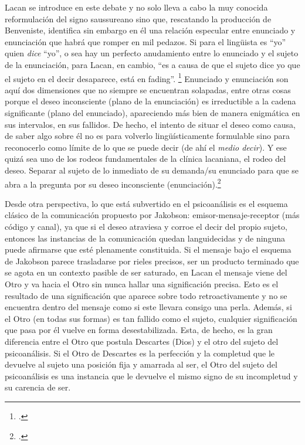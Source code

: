 Lacan se introduce en este debate y no solo lleva a cabo la muy conocida reformulación del signo saussureano sino que, rescatando la producción de Benveniste, identifica sin embargo en él una relación especular entre enunciado y enunciación que habrá que romper en mil pedazos. Si para el lingüista es \enquote{yo} quien \emph{dice} \enquote{yo}, o sea hay un perfecto anudamiento entre lo enunciado y el sujeto de la enunciación, para Lacan, en cambio, \enquote{es a causa de que el sujeto dice yo  que el sujeto en el decir desaparece, está en fading}. \footcite[][96]{@7129-GIUSSANI1991} Enunciado y enunciación son aquí dos dimensiones que no siempre se encuentran solapadas, entre otras cosas porque el deseo inconsciente (plano de la enunciación) es irreductible a la cadena significante (plano del enunciado), apareciendo más bien de manera enigmática en sus intervalos, en sus fallidos. De hecho, el intento de situar el deseo como causa, de saber algo sobre él no es para volverlo lingüísticamente formulable sino para reconocerlo como límite de lo que se puede decir (de ahí el \emph{medio decir}). Y ese quizá sea uno de los rodeos fundamentales de la clínica lacaniana, el rodeo del deseo. Separar al sujeto de lo inmediato de su demanda/su enunciado  para que se abra a la pregunta por su deseo inconsciente (enunciación).\footcite[][169]{@7016-MARQUESRODILLA2001}

Desde otra perspectiva, lo que está subvertido en el psicoanálisis es el esquema clásico de la comunicación propuesto por Jakobson: emisor-mensaje-receptor (más código y canal), ya que si el deseo atraviesa y corroe el decir del propio sujeto, entonces las instancias de la comunicación quedan languidecidas y de ninguna puede afirmarse que esté plenamente constituida. Si el mensaje bajo el esquema de Jakobson parece trasladarse por rieles precisos, ser un producto terminado que se agota en un contexto pasible de ser saturado, en Lacan el mensaje viene del Otro y va hacia el Otro sin nunca hallar una significación precisa. Esto es el resultado de una significación que aparece sobre todo retroactivamente y no se encuentra dentro del mensaje como si este llevara consigo una perla. Además, si el Otro (en todas sus formas) es tan fallido como el sujeto, cualquier significación que pasa por él vuelve en forma desestabilizada. Esta, de hecho, es la gran diferencia entre el Otro que postula Descartes (Dios) y el otro del sujeto del psicoanálisis. Si el Otro de Descartes es la perfección y la completud que le devuelve al sujeto una posición fija y amarrada al ser, el Otro del sujeto del psicoanálisis es una instancia que le devuelve el mismo signo de su incompletud y su carencia de ser.

